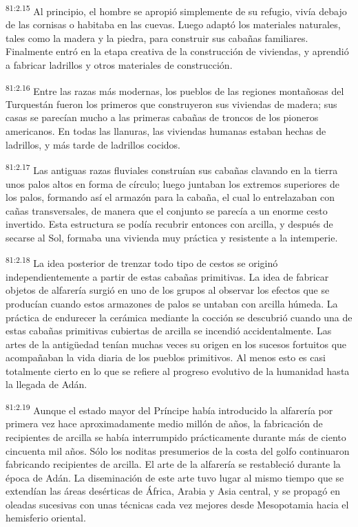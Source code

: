 \documentclass[twoside, 11pt]{book}
\begin{document}
\par
\textsuperscript{81:2.15} Al principio, el hombre se apropió simplemente de su refugio, vivía debajo de las cornisas o habitaba en las cuevas. Luego adaptó los materiales naturales, tales como la madera y la piedra, para construir sus cabañas familiares. Finalmente entró en la etapa creativa de la construcción de viviendas, y aprendió a fabricar ladrillos y otros materiales de construcción.

\par
\textsuperscript{81:2.16} Entre las razas más modernas, los pueblos de las regiones montañosas del Turquestán fueron los primeros que construyeron sus viviendas de madera; sus casas se parecían mucho a las primeras cabañas de troncos de los pioneros americanos. En todas las llanuras, las viviendas humanas estaban hechas de ladrillos, y más tarde de ladrillos cocidos.

\par
\textsuperscript{81:2.17} Las antiguas razas fluviales construían sus cabañas clavando en la tierra unos palos altos en forma de círculo; luego juntaban los extremos superiores de los palos, formando así el armazón para la cabaña, el cual lo entrelazaban con cañas transversales, de manera que el conjunto se parecía a un enorme cesto invertido. Esta estructura se podía recubrir entonces con arcilla, y después de secarse al Sol, formaba una vivienda muy práctica y resistente a la intemperie.

\par
\textsuperscript{81:2.18} La idea posterior de trenzar todo tipo de cestos se originó independientemente a partir de estas cabañas primitivas. La idea de fabricar objetos de alfarería surgió en uno de los grupos al observar los efectos que se producían cuando estos armazones de palos se untaban con arcilla húmeda. La práctica de endurecer la cerámica mediante la cocción se descubrió cuando una de estas cabañas primitivas cubiertas de arcilla se incendió accidentalmente. Las artes de la antig\"uedad tenían muchas veces su origen en los sucesos fortuitos que acompañaban la vida diaria de los pueblos primitivos. Al menos esto es casi totalmente cierto en lo que se refiere al progreso evolutivo de la humanidad hasta la llegada de Adán.

\par
\textsuperscript{81:2.19} Aunque el estado mayor del Príncipe había introducido la alfarería por primera vez hace aproximadamente medio millón de años, la fabricación de recipientes de arcilla se había interrumpido prácticamente durante más de ciento cincuenta mil años. Sólo los noditas presumerios de la costa del golfo continuaron fabricando recipientes de arcilla. El arte de la alfarería se restableció durante la época de Adán. La diseminación de este arte tuvo lugar al mismo tiempo que se extendían las áreas desérticas de África, Arabia y Asia central, y se propagó en oleadas sucesivas con unas técnicas cada vez mejores desde Mesopotamia hacia el hemisferio oriental.
\end{document}

